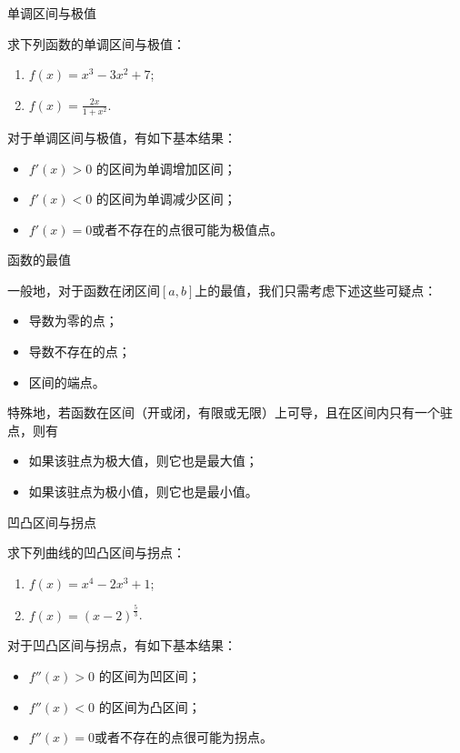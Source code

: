 \documentclass[14pt,notheorems,leqno,xcolor={rgb}]{beamer} %
\begin{document}
\begin{frame}{单调区间与极值}
\begin{example}
求下列函数的单调区间与极值：
\begin{enumerate}
\item $f(x)=x^3-3x^2+7$;
\item $f(x)=\frac{2x}{1+x^2}$.
\end{enumerate}
\end{example}
\pause
\begin{fact*}
对于单调区间与极值，有如下基本结果：
\begin{itemize}
\item $f'(x)>0$ 的区间为单调增加区间；
\item $f'(x)<0$ 的区间为单调减少区间；
\item $f'(x)=0$或者不存在的点很可能为极值点。
\end{itemize}
\end{fact*}
\end{frame}

\begin{frame}{函数的最值}
\begin{fact*}
一般地，对于函数在闭区间$[a,b]$上的最值，我们只需考虑下述这些可疑点：
\begin{itemize}
\item 导数为零的点；
\item 导数不存在的点；
\item 区间的端点。
\end{itemize}
\end{fact*}
\pause
\begin{fact*}
特殊地，若函数在区间（开或闭，有限或无限）上可导，且在区间内只有一个驻点，则有
\begin{itemize}
\item 如果该驻点为极大值，则它也是最大值；
\item 如果该驻点为极小值，则它也是最小值。
\end{itemize}
\end{fact*}
\end{frame}

\begin{frame}{凹凸区间与拐点}
\begin{example}
求下列曲线的凹凸区间与拐点：
\begin{enumerate}
\item $f(x)=x^4-2x^3+1$;
\item $f(x)=(x-2)^{\frac{5}{3}}$.
\end{enumerate}
\end{example}
\pause
\begin{fact*}
对于凹凸区间与拐点，有如下基本结果：
\begin{itemize}
\item $f''(x)>0$ 的区间为凹区间；
\item $f''(x)<0$ 的区间为凸区间；
\item $f''(x)=0$或者不存在的点很可能为拐点。
\end{itemize}
\end{fact*}
\end{frame}
\end{document}
